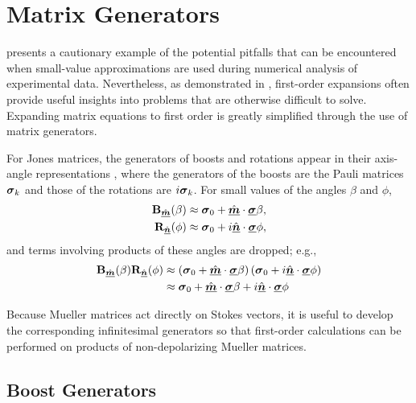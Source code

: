 \section{Matrix Generators}

 presents a cautionary example of the potential pitfalls that can be encountered when small-value approximations are used during numerical analysis of experimental data.
%
Nevertheless, as demonstrated in , first-order expansions often provide useful insights into problems that are otherwise difficult to solve.
%
Expanding matrix equations to first order is greatly simplified through the use of matrix generators.

For Jones matrices, the generators of boosts and rotations appear in their axis-angle representations , where the generators of the boosts are the Pauli matrices $\mbox{\boldmath $\sigma$}_{k}$ and those of the rotations are $i\mbox{\boldmath $\sigma$}_{k}$.  For small values of the angles $\beta$ and $\phi$,
%
\begin{align}
\label{eqn:small_Boost}
{\bf B}_{\hat{\underline{\mbox{\scriptsize\boldmath $m$}}}}(\beta) \approx \mbox{\boldmath $\sigma$}_{0} + \hat{\underline{\mbox{\boldmath $m$}}} \cdot \underline{\mbox{\boldmath $\sigma$}} \beta, \\
\label{eqn:small_Rotation}
{\bf R}_{\hat{\underline{\mbox{\scriptsize\boldmath $n$}}}}(\phi) \approx \mbox{\boldmath $\sigma$}_{0} + i \hat{\underline{\mbox{\boldmath $n$}}} \cdot \underline{\mbox{\boldmath $\sigma$}} \phi,
\end{align}
%
and terms involving products of these angles are dropped; e.g.,
\begin{equation}
\begin{split}
\label{eqn:small_Product}
{\bf B}_{\hat{\underline{\mbox{\scriptsize\boldmath $m$}}}}(\beta) {\bf R}_{\hat{\underline{\mbox{\scriptsize\boldmath $n$}}}}(\phi) & \approx \left(\mbox{\boldmath $\sigma$}_{0} + \hat{\underline{\mbox{\boldmath $m$}}} \cdot \underline{\mbox{\boldmath $\sigma$}} \beta \right) \left( \mbox{\boldmath $\sigma$}_{0} + i \hat{\underline{\mbox{\boldmath $n$}}} \cdot \underline{\mbox{\boldmath $\sigma$}} \phi \right) \\
& \approx \mbox{\boldmath $\sigma$}_{0} + \hat{\underline{\mbox{\boldmath $m$}}} \cdot \underline{\mbox{\boldmath $\sigma$}} \beta + i \hat{\underline{\mbox{\boldmath $n$}}} \cdot \underline{\mbox{\boldmath $\sigma$}} \phi
\end{split}
\end{equation}

Because Mueller matrices act directly on Stokes vectors, it is useful to develop the corresponding 
infinitesimal generators so that first-order calculations can be performed on products of 
non-depolarizing Mueller matrices.

\subsection{Boost Generators}

